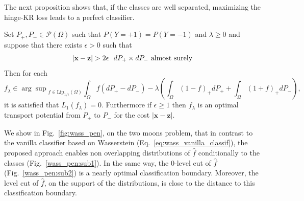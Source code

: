 The next proposition shows that, if the classes are well separated, maximizing the hinge-KR loss leads to a perfect classifier.%
\begin{Proposition}\label{coro:epsilon}
Set  $P_+, P_-\in \mathcal{P}(\Omega)$ such that $P(Y=+1)=P(Y=-1)$ and $\lambda\geq 0$ and suppose that there exists $\epsilon>0$ such that
\begin{align}\label{coro:hipotesis}
	| {\textbf{x}}-{\textbf{{{\textbf{z}}}}} |> 2 \epsilon \ \ dP_+\times dP_- \text{ almost surely}
\end{align}
Then for each
$$
	f_{\lambda}\in {\arg\sup}_{f\in \text{Lip}_{1/\epsilon}(\Omega)}\int_{\Omega}f(dP_+-dP_-)-
	\lambda \left( \int_{\Omega}(1-f)_+dP_+ +\int_{\Omega}(1+f)_+dP_-\right),
$$
it is satisfied that $L_1(f_{\lambda})=0.$ Furthermore if $\epsilon\geq 1$ then $f_{\lambda}$ is an optimal transport potential from $P_+$ to $P_-$ for the cost $| {\textbf{x}}-{{\textbf{z}}}|$.
\end{Proposition}
We show in Fig.~\ref{fig:wass_pen}, on the two moons problem, that in contrast to the vanilla classifier based on Wasserstein (Eq.~\eqref{eq:wass_vanilla_classif}), the proposed approach enables non overlapping distributions of $\hat{f}$ conditionally to the classes (Fig.~\ref{wass_pen:sub1}).
In the same way, the 0-level cut of $\hat{f}$ (Fig.~\ref{wass_pen:sub2}) is a nearly optimal classification boundary. Moreover, the level cut of $\hat{f}$, on the support of the distributions, is close to the distance to this classification boundary.
